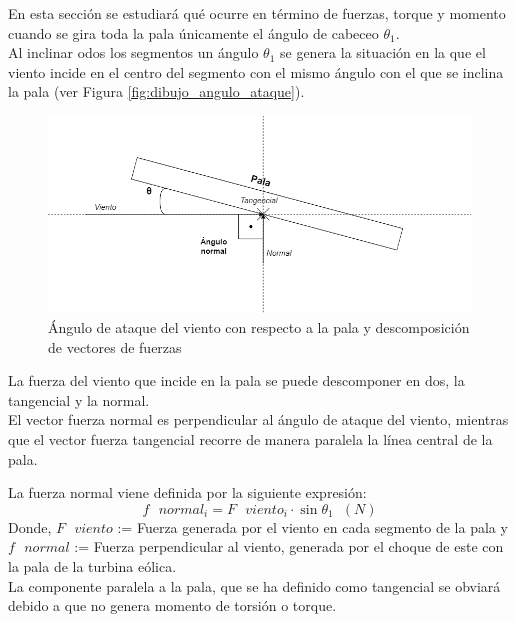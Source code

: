 En esta sección se estudiará qué ocurre en término de fuerzas, torque y momento cuando se gira toda la pala únicamente el ángulo de cabeceo $ \theta_1 $. \\


Al inclinar odos los segmentos un ángulo $ \theta_1 $ se genera la situación en la que el viento incide en el centro del segmento con el mismo ángulo con el que se inclina la pala (ver Figura \ref{fig:dibujo_angulo_ataque}). \\

\begin{figure}[H]
    \centering
    \includegraphics[width=1\textwidth]{images/dibujo fuerzas.drawio.png}
    \caption{Ángulo de ataque del viento con respecto a la pala y descomposición de vectores de fuerzas}
    
    \label{fig:dibujo_fuerzas}
\end{figure}

La fuerza del viento que incide en la pala se puede descomponer en dos, la tangencial y la normal. \\

El vector fuerza normal es perpendicular al ángulo de ataque del viento, mientras que el vector fuerza tangencial recorre de manera paralela la línea central de la pala.

 La fuerza normal viene definida por la siguiente expresión:
 \begin{equation}
   f \text{ } normal_i = F \text{ } viento_i \cdot \sin{\theta_1} \hspace{7pt} (N)
 \label{def:fuerza_normal}
 \end{equation}
 Donde, $F \text{ } viento$ := Fuerza generada por el viento en cada segmento de la pala y $f \text{ } normal$ := Fuerza perpendicular al viento, generada por el choque de este con la pala de la turbina eólica.\\


La componente paralela a la pala, que se ha definido como tangencial se obviará debido a que no genera momento de torsión o torque.\\
  
